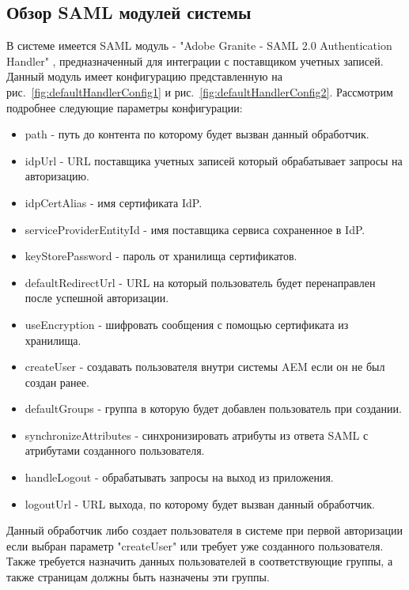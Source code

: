 \subsection{Обзор SAML модулей системы}
В системе имеется SAML модуль - "Adobe Granite - SAML 2.0 Authentication Handler" \cite{web:aemSaml}, предназначенный для интеграции с поставщиком учетных записей. Данный модуль имеет конфигурацию представленную на рис.~\ref{fig:defaultHandlerConfig1} и рис.~\ref{fig:defaultHandlerConfig2}. Рассмотрим подробнее следующие параметры конфигурации:
\begin{itemize}
\item path - путь до контента по которому будет вызван данный обработчик.
\item idpUrl - URL поставщика учетных записей который обрабатывает запросы на авторизацию.
\item idpCertAlias - имя сертификата IdP.
\item serviceProviderEntityId - имя поставщика сервиса сохраненное в IdP.
\item keyStorePassword - пароль от хранилища сертификатов.
\item defaultRedirectUrl - URL на который пользователь будет перенаправлен после успешной авторизации.
\item useEncryption - шифровать сообщения с помощью сертификата из хранилища.
\item createUser - создавать пользователя внутри системы AEM если он не был создан ранее.
\item defaultGroups - группа в которую будет добавлен пользователь при создании.
\item synchronizeAttributes - синхронизировать атрибуты из ответа SAML с атрибутами созданного пользователя.
\item handleLogout - обрабатывать запросы на выход из приложения.
\item logoutUrl - URL выхода, по которому будет вызван данный обработчик.
\end{itemize}

Данный обработчик либо создает пользователя в системе при первой авторизации если выбран параметр "createUser" или требует уже созданного пользователя. Также требуется назначить данных пользователей в соответствующие группы, а также страницам должны быть назначены эти группы. 

